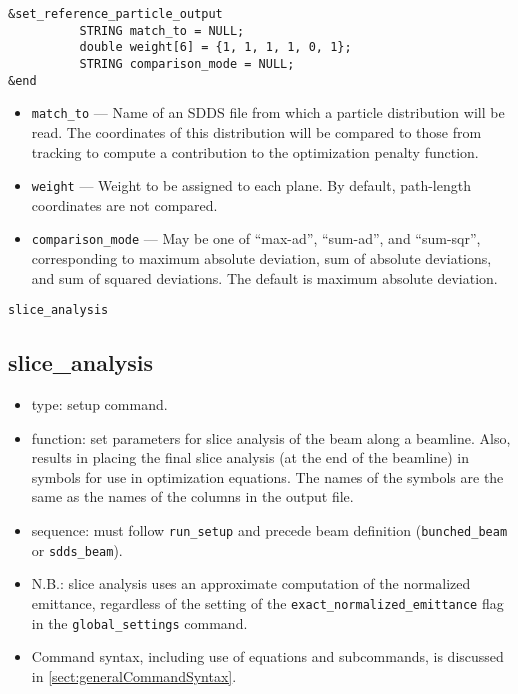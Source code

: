 \documentclass[11pt]{article}
\begin{document}
\begin{verbatim}
&set_reference_particle_output
          STRING match_to = NULL;
          double weight[6] = {1, 1, 1, 1, 0, 1};
          STRING comparison_mode = NULL;
&end

\end{verbatim}

\begin{itemize}
\item \verb|match_to| --- Name of an SDDS file from which a particle distribution will be read. The coordinates
  of this distribution will be compared to those from tracking to compute a contribution to the optimization
  penalty function.
\item \verb|weight| --- Weight to be assigned to each plane. By default, path-length coordinates are not compared.
\item \verb|comparison_mode| --- May be one of ``max-ad'', ``sum-ad'', and ``sum-sqr'', corresponding to
  maximum absolute deviation, sum of absolute deviations, and sum of squared deviations.
  The default is maximum absolute deviation.
\end{itemize}


\newpage
\begin{center}{\Large\verb|slice_analysis|}\end{center}
\subsection{slice\_analysis \label{subsec:sliceanalysis}}

\begin{itemize}
\item type: setup command.
\item function: set parameters for slice analysis of the beam along a
	beamline.  Also, results in placing the final slice analysis
        (at the end of the beamline) in symbols for use in optimization
        equations.  The names of the symbols are the same as the names
        of the columns in the output file.
\item sequence: must follow \verb|run_setup| and precede beam definition (\verb|bunched_beam| or \verb|sdds_beam|).
\item N.B.: slice analysis uses an approximate computation of the normalized emittance, regardless of the
  setting of the \verb|exact_normalized_emittance| flag in the \verb|global_settings| command.
\item Command syntax, including use of equations and subcommands, is discussed in \ref{sect:generalCommandSyntax}.
\end{itemize}
\end{document}

